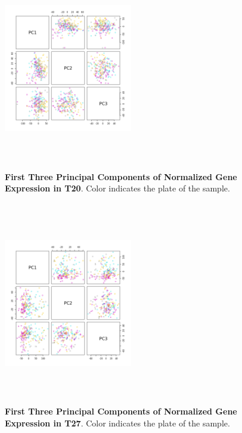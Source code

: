 \documentclass[article,9pt,twocolumn,twoside]{rilabRxiv}
\begin{document}
\begin{figure}[!ht]
\centering
\includegraphics[width=0.5\textwidth,height=3.5in]{figures/exp_WD_0720_PC_pairs.png}
\caption{\textbf{First Three Principal Components of Normalized Gene Expression in T20}. Color indicates the plate of the sample.}
\label{fig:chapter2_t20pc}
\end{figure}

\begin{figure}[!ht]
\centering
\includegraphics[width=0.5\textwidth,height=3.5in]{figures/exp_WD_0727_PC_pairs.png}
\caption{\textbf{First Three Principal Components of Normalized Gene Expression in T27}. Color indicates the plate of the sample.}
\label{fig:chapter2_t27pc}
\end{figure}
\end{document}
